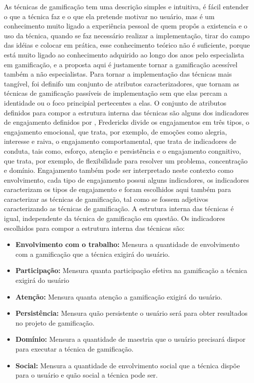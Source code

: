 As técnicas de gamificação tem uma descrição simples e intuitiva, é fácil entender o que a técnica faz e o que ela pretende motivar no usuário, mas é um conhecimento muito ligado a experiência pessoal de quem propôs a existencia e o uso da técnica, quando se faz necessário realizar a implementação, tirar do campo das idéias e colocar em prática, esse conhecimento teórico não é suficiente, porque está muito ligado ao conhecimento adquirido ao longo dos anos pelo especialista em gamificação, e a proposta aqui é justamente tornar a gamificação acessível também a não especialistas. Para tornar a implementação das técnicas mais tangível, foi definifo um conjunto de atributos caracterizadores, que tornam as técnicas de gamificação passíveis de implementação sem que elas percam a identidade ou o foco principial pertecentes a elas. O conjunto de atributos definidos para compor a estrutura interna das técnicas são alguns dos indicadores de engajamento definidos por \cite{fredericks2004}, Fredericks divide os engajamentos em três tipos, o engajamento emocional, que trata, por exemplo, de emoções como alegria, interesse e raiva, o engajamento comportamental, que trata de indicadores de conduta, tais como, esforço, atenção e persistência e o engajamento congnitivo, que trata, por exemplo, de flexibilidade para resolver um problema, concentração e domínio. Engajamento também pode ser interpretado neste contexto como envolvimento, cada tipo de engajamento possui alguns indicadores, os indicadores caracterizam os tipos de engajamento e foram escolhidos aqui também para caracterizar as técnicas de gamificação, tal como se fossem adjetivos caracterizando as técnicas de gamificação.  A estrutura interna das técnicas é igual, independente da técnica de gamificação em questão. Os indicadores escolhidos para compor a estrutura interna das técnicas são: 

\begin{itemize}
\item  \textbf {Envolvimento com o trabalho:}  Mensura a quantidade de envolvimento com a gamificação que a técnica exigirá do usuário.
\item  \textbf {Participação:}  Mensura quanta participação efetiva na gamificação a técnica exigirá do usuário
\item  \textbf {Atenção:}  Mensura quanta atenção a gamificação exigirá do usuário.
\item  \textbf {Persistência:} Mensura quão persistente o usuário será para obter resultados no projeto de gamificação. 
\item  \textbf {Domínio:} Mensura a quantidade de maestria que o usuário precisará dispor para executar a técnica de gamificação. 
\item  \textbf{Social:} Mensura a quantidade de envolvimento social que a técnica dispõe para o usuário e quão social a técnica pode ser.
\end{itemize}


